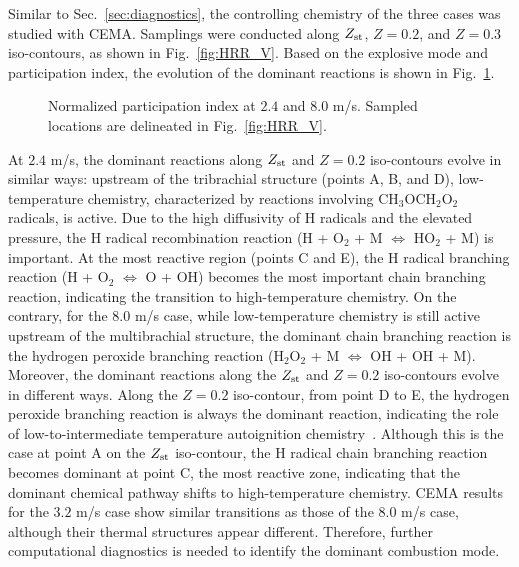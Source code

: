Similar to Sec.~\ref{sec:diagnostics}, the controlling chemistry of the three cases was studied with CEMA.  Samplings were conducted along $Z_{\rm st}$, $Z = 0.2$, and $Z = 0.3$ iso-contours, as shown in Fig.~\ref{fig:HRR_V}.  Based on the explosive mode and participation index, the evolution of the dominant reactions is shown in Fig.~\ref{fig:CEMA_V}.

\begin{figure}
  \centering
  \scriptsize
  \resizebox{1.0\textwidth}{!}{}
  \resizebox{1.0\textwidth}{!}{}
  \normalsize
  \caption{Normalized participation index at $2.4$ and $8.0$ m/s.  Sampled locations are delineated in Fig.~\ref{fig:HRR_V}.}
  \label{fig:CEMA_V}
\end{figure}

At $2.4$ m/s, the dominant reactions along $Z_{\rm st}$ and $Z = 0.2$ iso-contours evolve in similar ways: upstream of the tribrachial structure (points A, B, and D), low-temperature chemistry, characterized by reactions involving CH$_3$OCH$_2$O$_2$ radicals, is active.  Due to the high diffusivity of H radicals and the elevated pressure, the H radical recombination reaction (H + O$_2$ + M $\Longleftrightarrow$ HO$_2$ + M) is important.  At the most reactive region (points C and E), the H radical branching reaction (H + O$_2$ $\Longleftrightarrow$ O + OH) becomes the most important chain branching reaction, indicating the transition to high-temperature chemistry.  On the contrary, for the $8.0$ m/s case, while low-temperature chemistry is still active upstream of the multibrachial structure, the dominant chain branching reaction is the hydrogen peroxide branching reaction (H$_2$O$_2$ + M $\Longleftrightarrow$ OH + OH + M).  Moreover, the dominant reactions along the $Z_{\rm st}$ and $Z = 0.2$ iso-contours evolve in different ways.  Along the $Z = 0.2$ iso-contour, from point D to E, the hydrogen peroxide branching reaction is always the dominant reaction, indicating the role of low-to-intermediate temperature autoignition chemistry~\cite{westbrook00}.  Although this is the case at point A on the $Z_{\rm st}$ iso-contour, the H radical chain branching reaction becomes dominant at point C, the most reactive zone, indicating that the dominant chemical pathway shifts to high-temperature chemistry.  CEMA results for the $3.2$ m/s case show similar transitions as those of the $8.0$ m/s case, although their thermal structures appear different.  Therefore, further computational diagnostics is needed to identify the dominant combustion mode.

